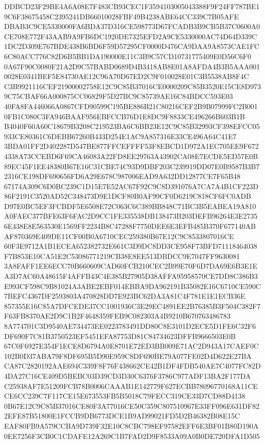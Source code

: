 \documentclass[UTF8,fontset=fandol,zihao=-4,a4paper]{ctexart}
\begin{document}
{{DDBCD23F29BE4A6A08E7F483CB93CEC1F3594103005043388F9F24FF787BE19C6F38675458C2395241DB66010028FBF49B4238ABE64CC339C7B05AFE
DBAB3C9CE5330000FA6BDA37D316CE598773D67FCADB3B9CB5B37C0600A0CE708E772F43AAB9A9FB6DC1920DE7325EFD2A9CE5330000AC74D64D339C
1DC2D309E767BDE438B6BD6F59D57295CF0000D476CA9DAA9A8573CAE1FC6C80ACC776C82D6B5BB1DA190000E11C3B9C57CD10731775409E0D56C6F0
0A67F90C0080F21A2D9C57BABD0689D4B3418AB8E01A8AFDA4B3B5AAA0010028E0341BEF5E84730AE12C96A70D67ED2C9F010028E01C3B5538AB8F4C
C3B9921116CEF21900002758E12C9C85B37016CE0000209C85B3520E15CE8D9739C75CBAF66A000875CC06829F5D27BC9C85739AE16C84BDCC593E03
40FA8FA446066A0867CFD90599C195BE886B21C80216CEF2B9B07999FC2B0010FB1C080C3FA946BAAF956EBFCCB76D1E8DC9F8833CE496266B603B1B
B4040F60A60C18679B3208C219523BA6C6BB23E12C9C85B32993CF398EFCC05933CE80361C6DEBB67260B433D254E1AC9A857316E33CE496A64C41E7
3BDA01FF2D402287D547BE877FFCEFFFF53F8EBCD1D972A1EC705EE9F6724338A73CCEBD6F69CA46083A22FD8EE29763A43902CA08E7ECDE5ED57E0B
89EC45F1EE48380B67E16C31CBE74C93D9DBF203C239919DD07E0B9587B3B72316CE198DF690656FD6A29E678C987006EAD9A632DD12877CE7F65B48
67174A309C6D0BC239C1D15E7E52AC67F92C9C8D391076A7CA7A4B1CF223D86F2191C3520AD52C348473D9E1DCF80B0AF99CF0D6219C818CF6FC0ADB
D97E0BC5EF3FCBDF5E6508E72C063C6C389BB848C71BC3B5EABEA19A810A0FAEC377BFE63F6FAC2D9CC1FE335538DB138473B203DEFB96264E3E2735
6E438E8E563530E1569FF2234B8C47288F7750DEE6E3EFB485B370F677140ABAF870369E409DE11CF00B0A6710CEC259380B67E12C9C8533807016CE
60F3E9712A1B1ECEA652382732E661C3D9DC8DD3CE958F73BFD71118464038F7B853E10CA51E2C53086771219CB38E8EE513DBDCC9E7047FF9630081
3A8FAFF1EE6ECC70B660609CAD60FCB210CEC2B99E70F6D7DA69E6B3E1EA3D7AC60A48615F4AFFB43C4E385B27905D38AFFA95958570CE7DD8C386B3
E993CF598C9B81024A3ABE2EBF014EBBA9DA962191B35082E16C6710CE590C7BEFC4367DF2593803A470828DD7E923BC62DA3A81C4F781E1E1ECB36E
857355E16C85A7DFCEDE37CC1001936C3E29EC4891EE2B76385B3F504C382F7F63FB8370AE2D9C1B2F4648359FEB9C082303A4B9210B670763486783
8A774701C3D9540AE734473EE0223783491DD80C8E3101D2ECE5D1FE6C32F6DF690F7C81B3750523EF5451EFA87753D81C84734623DFFB9666503E0B
67C0F6927E354F1ECE8D6794A0E8701E72ED3BB009E71AC2D943A17CAEF0C102B0D37ABA79F8DF695B5D90E959C8DF690BE79A077FE02D4D622E27BA
CA87C2820192AAE694C339F8F76F438662CE42B1DF4FDB540AE7C4077FC82D4DA27C16CE409D5BEBC03D39CD3D30C6376F3786C977ADF13BA2F177DA
C25938AF7E51209FCB78B0006CAAAB1E142779F627ECBB78096770168A11CECE6CC239C7F117CE15E673553FB5B5018C79FECC319CE33D7CD88D4138
0B67E12C9C85B37016CE80F3A77016CE50C359C807510967E33FF096E631DF822EFE87B51800E1FCCB9DB6773DCE1B9AD99021FD5D2B46382B08E15C
EAF80FB9A579CCBA9D739F32E10C8CBC798EF97582EFF6E3BF01B80D190A0EE7256F3CB0C1CDAFE12A269C1B7FAD2D9F8533A09A0B0DE720DFA1D505
}}
\end{document}
